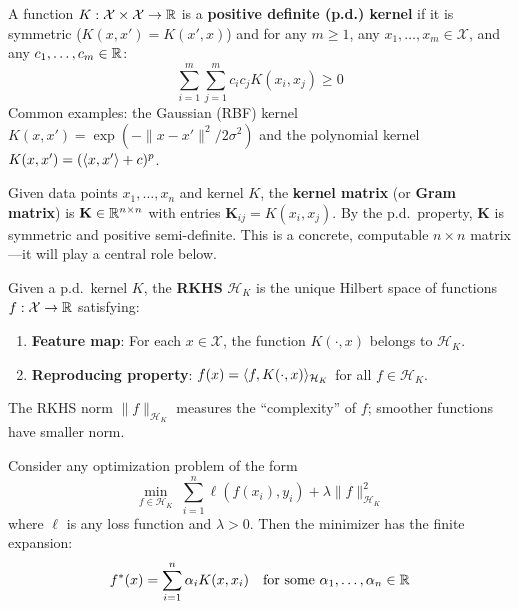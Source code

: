 \begin{notechapter}
\begin{definition}
\label{semi-supervised-graphs:def:kernel}
A function $K: \mathcal{X} \times \mathcal{X} \to \mathbb{R}$ is a
\textbf{positive definite (p.d.) kernel} if it is symmetric
($K(x, x') = K(x', x)$) and for any $m \geq 1$, any $x_1, \ldots, x_m
\in \mathcal{X}$, and any $c_1, \ldots, c_m \in \mathbb{R}$:
\begin{equation}
\sum_{i=1}^m \sum_{j=1}^m c_i c_j K(x_i, x_j) \geq 0
\end{equation}
Common examples: the Gaussian (RBF) kernel
$K(x,x') = \exp(-\|x - x'\|^2 / 2\sigma^2)$ and the polynomial kernel
$K(x,x') = (\langle x, x' \rangle + c)^p$.
\end{definition}

\begin{definition}
\label{semi-supervised-graphs:def:gram}
Given data points $x_1, \ldots, x_n$ and kernel $K$, the \textbf{kernel matrix}
(or \textbf{Gram matrix}) is $\mathbf{K} \in \mathbb{R}^{n \times n}$ with entries
$\mathbf{K}_{ij} = K(x_i, x_j)$. By the p.d.\ property, $\mathbf{K}$ is
symmetric and positive semi-definite. This is a concrete, computable
$n \times n$ matrix---it will play a central role below.
\end{definition}

\begin{definition}
\label{semi-supervised-graphs:def:rkhs}
Given a p.d.\ kernel $K$, the \textbf{RKHS} $\mathcal{H}_K$ is the unique
Hilbert space of functions $f: \mathcal{X} \to \mathbb{R}$ satisfying:
\begin{enumerate}
    \item \textbf{Feature map}: For each $x \in \mathcal{X}$, the function
      $K(\cdot, x)$ belongs to $\mathcal{H}_K$.
    \item \textbf{Reproducing property}:
      $f(x) = \langle f, K(\cdot, x) \rangle_{\mathcal{H}_K}$ for all
      $f \in \mathcal{H}_K$.
\end{enumerate}
The RKHS norm $\|f\|_{\mathcal{H}_K}$ measures the ``complexity'' of $f$;
smoother functions have smaller norm.
\end{definition}

\begin{theorem}
\label{semi-supervised-graphs:thm:representer}
Consider any optimization problem of the form
\begin{equation}
\label{semi-supervised-graphs:eq:representer_problem}
\min_{f \in \mathcal{H}_K}\; \sum_{i=1}^n \ell(f(x_i), y_i) + 
\lambda \|f\|_{\mathcal{H}_K}^2
\end{equation}
where $\ell$ is any loss function and $\lambda > 0$. Then the minimizer has
the finite expansion:
\begin{equation}
\label{semi-supervised-graphs:eq:representer_solution}
f^*(x) = \sum_{i=1}^n \alpha_i K(x, x_i) \quad
\text{for some } \alpha_1, \ldots, \alpha_n \in \mathbb{R}
\end{equation}
\end{theorem}


\end{notechapter}
